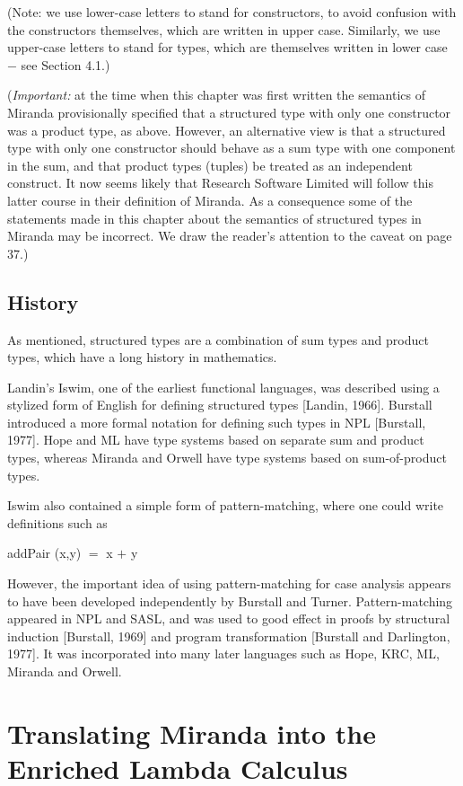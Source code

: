 (Note: we use lower-case letters to stand for constructors, to avoid confusion with the constructors themselves, which are written in upper case. Similarly, we use upper-case letters to stand for types, which are themselves written in lower case $-$ see Section 4.1.)

(\textit{Important:} at the time when this chapter was first written the semantics of Miranda provisionally specified that a structured type with only one constructor was a product type, as above. However, an alternative view is that a structured type with only one constructor should behave as a sum type with one component in the sum, and that product types (tuples) be treated as an independent construct. It now seems likely that Research Software Limited will follow this latter course in their definition of Miranda. As a consequence some of the statements made in this chapter about the semantics of structured types in Miranda may be incorrect. We draw the reader's attention to the caveat on page 37.)

\subsection{History}

As mentioned, structured types are a combination of sum types and product types, which have a long history in mathematics.

Landin's Iswim, one of the earliest functional languages, was described using a stylized form of English for defining structured types [Landin, 1966]. Burstall introduced a more formal notation for defining such types in NPL [Burstall, 1977]. Hope and ML have type systems based on separate sum and product types, whereas Miranda and Orwell have type systems based on sum-of-product types.

Iswim also contained a simple form of pattern-matching, where one could write definitions such as
\begin{mlcoded}
    addPair (x,y) $=$ x $+$ y
\end{mlcoded}
However, the important idea of using pattern-matching for case analysis appears to have been developed independently by Burstall and Turner. Pattern-matching appeared in NPL and SASL, and was used to good effect in proofs by structural induction [Burstall, 1969] and program transformation
[Burstall and Darlington, 1977]. It was incorporated into many later
languages such as Hope, KRC, ML, Miranda and Orwell.

\section{Translating Miranda into the Enriched Lambda Calculus}

